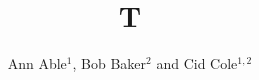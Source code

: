 \documentclass{llncs}
\begin{document}
\title{T}
\author{Ann Able$^{1}$, Bob Baker$^{2}$ and Cid Cole$^{1,2}$}
\maketitle
\end{document}
